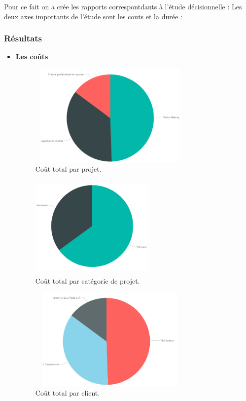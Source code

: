 \bigskip
Pour ce fait on a cr\'{e}e les rapports correspontdants \`{a} l'\'{e}tude d\'{e}cisionnelle :
Les deux axes importants de l'\'{e}tude sont les couts et la dur\'{e}e :


\newpage
\subsubsection{R\'{e}sultats  }
\begin{itemize}

\item{ \textbf{Les  co\^{u}ts}  }

\begin{figure}[H]
\center
\includegraphics[width=8cm,height=5cm]{./figures/rpb1.png}
\caption{Co\^{u}t total par projet.}

\end{figure}

\begin{figure}[H]
\center
\includegraphics[width=6cm,height=5cm]{./figures/rpb2.png}
\caption{Co\^{u}t total par catégorie de projet.}

\end{figure}

\begin{figure}[H]
\center
\includegraphics[width=8cm,height=5cm]{./figures/rpb3.png}
\caption{Co\^{u}t total par client.}


\end{figure}
\end{itemize}
